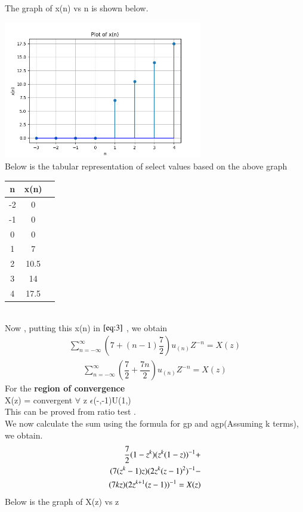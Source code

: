 \documentclass[journal,12pt,twocolumn]{IEEEtran}
\theoremstyle{remark}
\begin{document}
\begin{enumerate}
The graph of x(n) vs n is shown below.\\
\graphicspath{ {figs/} }
\includegraphics[width=10.cm, height=6cm]{Figure_1}
\\
Below is the tabular representation of select values based on the above graph\\
\begin{center}
\begin{tabular}{ |c|c|c| } 
 \hline
 n & x(n)  \\ 
 \hline
 -2 & 0\\
 -1 & 0  \\ 
  0 & 0  \\
  1 & 7  \\
  2 & 10.5\\
  3 & 14 \\
  4 & 17.5\\
 \hline
\end{tabular}
\end{center}
\\Now , putting this x(n) in $\eqref{eq:3}$ , we obtain \\
\begin{align}
     \sum_{n=-\infty}^{\infty}(7 + (n-1)\dfrac{7}{2})u_{(n)}Z^{-n} =X(z)
\end{align}
\begin{align}
\sum_{n=-\infty}^{\infty}(\dfrac{7}{2} + \dfrac{7n}{2})u_{(n)}Z^{-n} =X(z)
\end{align}
For the \textbf{region of convergence}\\
X(z) = convergent $\forall$ z $\epsilon$(-\infty,-1)U(1,\infty)
\\

This can be proved from ratio test . \\
We now calculate the sum using the formula for gp and agp(Assuming k terms), we obtain.\\

\begin{align}
   \notag \dfrac{7}{2}(1-z^k)(z^k(1-z))^{-1}+
   \\ \notag(7(z^k-1)z)(2z^k(z-1)^2)^{-1}-\\ (7kz)(2z^{k+1}(z-1))^{-1}=X(z)
\end{align}
Below is the graph of X(z) vs z\\


\end{enumerate}
\end{document}
